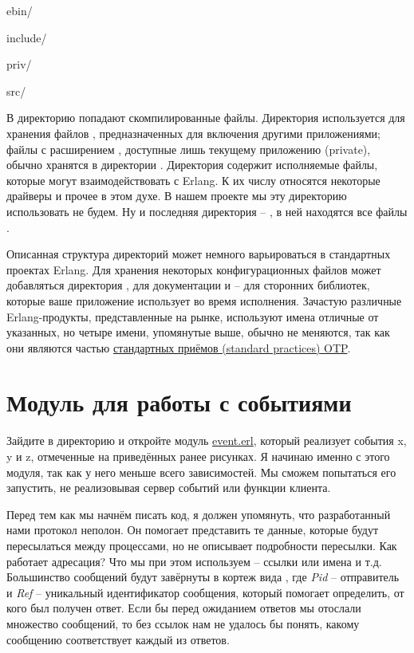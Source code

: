 ebin/

include/

priv/

src/

В директорию  попадают скомпилированные файлы.
Директория  используется для хранения файлов , предназначенных для включения другими приложениями; файлы с расширением , доступные лишь текущему приложению (private), обычно хранятся в директории .
Директория  содержит исполняемые файлы, которые могут взаимодействовать с Erlang.
К их числу относятся некоторые драйверы и прочее в этом духе.
В нашем проекте мы эту директорию использовать не будем.
Ну и последняя директория \--- , в ней находятся все файлы .

Описанная структура директорий может немного варьироваться в стандартных проектах Erlang.
Для хранения некоторых конфигурационных файлов может добавляться директория , для документации  и  \--- для сторонних библиотек, которые ваше приложение использует во время исполнения.
Зачастую различные Erlang\--продукты, представленные на рынке, используют имена отличные от указанных, но четыре имени, упомянутые выше, обычно не меняются, так как они являются частью \href{http://www.erlang.org/doc/design_principles/applications.html\#id71171}{стандартных приёмов (standard practices) OTP}.
\section{Модуль для работы с событиями}
\label{an-event-module}
Зайдите в директорию  и откройте модуль \href{file:///home/max/prog/learnyousomeerlang/original/learnyousomeerlang.com/static/erlang/event.erl}{event.erl}, который реализует события x, y и z, отмеченные на приведённых ранее рисунках.
Я начинаю именно с этого модуля, так как у него меньше всего зависимостей.
Мы сможем попытаться его запустить, не реализовывая сервер событий или функции клиента.

Перед тем как мы начнём писать код, я должен упомянуть, что разработанный нами протокол неполон.
Он помогает представить те данные, которые будут пересылаться между процессами, но не описывает подробности пересылки.
Как работает адресация? 
Что мы при этом используем \--- ссылки или имена и т.д.
Большинство сообщений будут завёрнуты в кортеж вида , где \emph{Pid} \--- отправитель и \emph{Ref} \--- уникальный идентификатор сообщения, который помогает определить, от кого был получен ответ.
Если бы перед ожиданием ответов мы отослали множество сообщений, то без ссылок нам не удалось бы понять, какому сообщению соответствует каждый из ответов.

